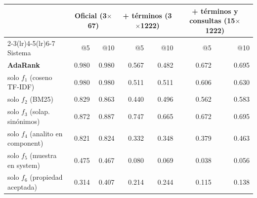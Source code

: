 \begin{tabular}{lrrrrrr}
\toprule
& \multicolumn{2}{c}{Oficial (3$\times$67)} & \multicolumn{2}{c}{+ términos (3$\times$1222)} & \multicolumn{2}{c}{+ términos y consultas (15$\times$1222)} \\
\cmidrule(lr){2-3}\cmidrule(lr){4-5}\cmidrule(lr){6-7}
Sistema & @5 & @10 & @5 & @10 & @5 & @10 \\
\midrule
\textbf{AdaRank} & 0.980 & 0.980 & 0.567 & 0.482 & 0.672 & 0.695 \\
solo $f_1$ (coseno TF-IDF) & 0.980 & 0.980 & 0.511 & 0.511 & 0.606 & 0.630 \\
solo $f_2$ (BM25) & 0.829 & 0.863 & 0.440 & 0.496 & 0.562 & 0.583 \\
solo $f_3$ (solap. sinónimos) & 0.872 & 0.887 & 0.747 & 0.665 & 0.672 & 0.695 \\
solo $f_4$ (analito en component) & 0.821 & 0.824 & 0.332 & 0.348 & 0.379 & 0.463 \\
solo $f_5$ (muestra en system) & 0.475 & 0.467 & 0.080 & 0.069 & 0.038 & 0.056 \\
solo $f_6$ (propiedad aceptada) & 0.314 & 0.407 & 0.214 & 0.244 & 0.115 & 0.138 \\
\bottomrule
\end{tabular}
